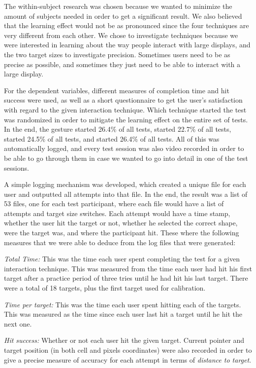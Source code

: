 The within-subject research was chosen because we wanted to minimize the amount of subjects needed in order to get a significant result. We also believed that the learning effect would not be as pronounced since the four techniques are very different from each other. 
We chose to investigate techniques because we were interested in learning about the way people interact with large displays, and the two target sizes to investigate precision. Sometimes users need to be as precise as possible, and sometimes they just need to be able to interact with a large display. 

For the dependent variables, different measures of completion time and hit success were used, as well as a short questionnaire to get the user's satisfaction with regard to the given interaction technique. 
Which technique started the test was randomized in order to mitigate the learning effect on the entire set of tests. 
In the end, the \pinch gesture started 26.4\% of all tests, \swipe started 22.7\% of all tests, \throw started 24.5\% of all tests, and \tilt started 26.4\% of all tests. 
All of this was automatically logged, and every test session was also video recorded in order to be able to go through them in case we wanted to go into detail in one of the test sessions.

A simple logging mechanism was developed, which created a unique file for each user and outputted all attempts into that file. 
In the end, the result was a list of 53 files, one for each test participant, where each file would have a list of attempts and target size switches. 
Each attempt would have a time stamp, whether the user hit the target or not, whether he selected the correct shape, were the target was, and where the participant hit. 
These where the following measures that we were able to deduce from the log files that were generated: 

\textit{Total Time:} This was the time each user spent completing the test for a given interaction technique. 
This was measured from the time each user had hit his first target after a practice period of three tries until he had hit his last target. 
There were a total of 18 targets, plus the first target used for calibration. 

\textit{Time per target:} This was the time each user spent hitting each of the targets. 
This was measured as the time since each user last hit a target until he hit the next one.

\textit{Hit success:} Whether or not each user hit the given target. 
Current pointer and target position (in both cell and pixels coordinates) were also recorded in order to give a precise measure of accuracy for each attempt in terms of \textit{distance to target}. 

